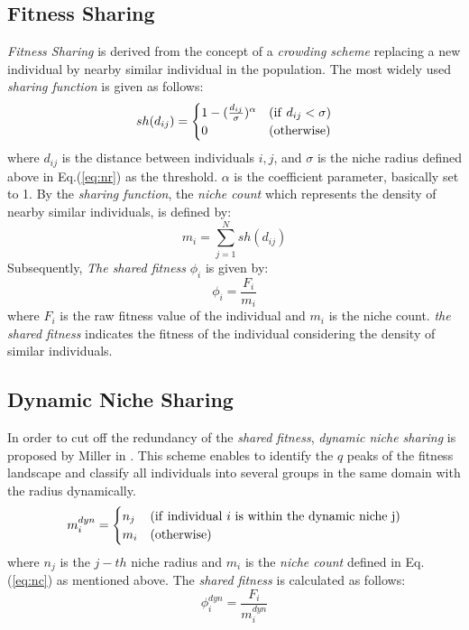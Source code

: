\subsection{Fitness Sharing}
\textit{Fitness Sharing} is derived from the concept of a \textit{crowding scheme} \cite{crowding} replacing a new individual by nearby similar individual in the population. The most widely used \textit{sharing function} is given as follows:
\begin{equation}
\label{eq:sh}
sh(d_{ij})= \begin{cases}
1-(\frac{d_{ij}}{\sigma})^\alpha & ({\rm if} \ d_{ij} < \sigma) \\
0 & ({\rm otherwise})
\end{cases}
\end{equation}
where $d_{ij}$ is the distance between individuals $i,j$, and $\sigma$ is the niche radius defined above in Eq.(\ref{eq:nr}) as the threshold. $\alpha$ is the coefficient parameter, basically set to 1. By the \textit{sharing function}, the \textit{niche count} which represents the density of nearby similar individuals, is defined by:
\begin{equation}
\label{eq:nc}
m_i=\sum_{j=1}^N sh(d_{ij})
\end{equation}
Subsequently, \textit{The shared fitness} $\phi_i$ is given by:
\begin{equation}
\label{sf}
\phi_i=\frac{F_i}{m_i}
\end{equation}
where $F_i$ is the raw fitness value of the individual and $m_i$ is the niche count. \textit{the shared fitness} indicates the fitness of the individual considering the density of similar individuals.

\subsection{Dynamic Niche Sharing}
In order to cut off the redundancy of the \textit{shared fitness}, \textit{dynamic niche sharing} is proposed by Miller in \cite{DNS}. This scheme enables to identify the $q$ peaks of the fitness landscape and classify all individuals into several groups in the same domain with the radius dynamically.
\begin{equation}
\label{eq:dns}
m_i^{dyn} = \begin{cases}
n_j & ({\rm if \ individual \ } i {\rm \ is \ within \ the \ dynamic \ niche \ } $j$) \\
m_i & ({\rm otherwise})
\end{cases}
\end{equation}
where $n_j$ is the $j-th$ niche radius and $m_i$ is the \textit{niche count} defined in Eq.(\ref{eq:nc}) as mentioned above. The \textit{shared fitness} is calculated as follows:
\begin{equation}
\label{dsf}
\phi_i^{dyn}=\frac{F_i}{m_i^{dyn}}
\end{equation}


